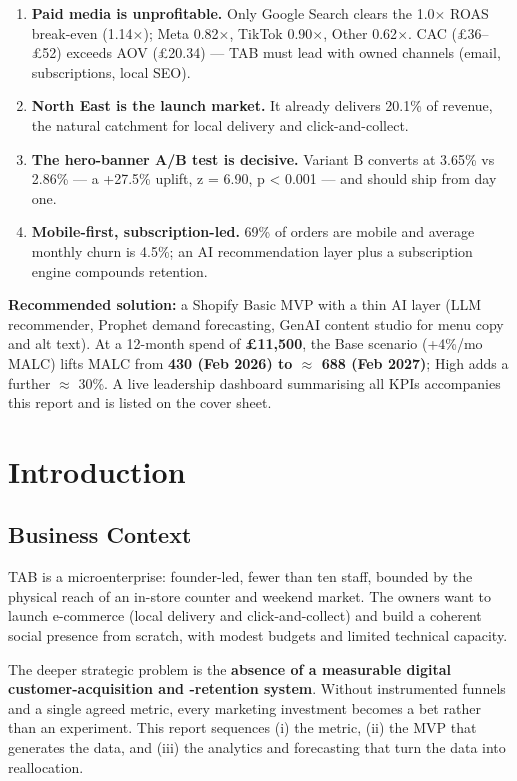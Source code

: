 \documentclass[
  11pt,
]{article}
\providecommand{\tightlist}{%
  \setlength{\itemsep}{0pt}\setlength{\parskip}{0pt}}
\begin{document}
\begin{enumerate}
\def\labelenumi{\arabic{enumi}.}
\tightlist
\item
  \textbf{Paid media is unprofitable.} Only Google Search clears the
  1.0\(\times\) ROAS break-even (1.14\(\times\)); Meta 0.82\(\times\),
  TikTok 0.90\(\times\), Other 0.62\(\times\). CAC (£36--£52) exceeds
  AOV (£20.34) --- TAB must lead with owned channels (email,
  subscriptions, local SEO).
\item
  \textbf{North East is the launch market.} It already delivers 20.1\%
  of revenue, the natural catchment for local delivery and
  click-and-collect.
\item
  \textbf{The hero-banner A/B test is decisive.} Variant B converts at
  3.65\% vs 2.86\% --- a +27.5\% uplift, z = 6.90, p \textless{} 0.001
  --- and should ship from day one.
\item
  \textbf{Mobile-first, subscription-led.} 69\% of orders are mobile and
  average monthly churn is 4.5\%; an AI recommendation layer plus a
  subscription engine compounds retention.
\end{enumerate}

\textbf{Recommended solution:} a Shopify Basic MVP with a thin AI layer
(LLM recommender, Prophet demand forecasting, GenAI content studio for
menu copy and alt text). At a 12-month spend of \textbf{£11,500}, the
Base scenario (+4\%/mo MALC) lifts MALC from \textbf{430 (Feb 2026) to
\(\approx\) 688 (Feb 2027)}; High adds a further \(\approx\) 30\%. A
live leadership dashboard summarising all KPIs accompanies this report
and is listed on the cover sheet.

\newpage

\section{Introduction}\label{introduction}

\subsection{Business Context}\label{business-context}

TAB is a microenterprise: founder-led, fewer than ten staff, bounded by
the physical reach of an in-store counter and weekend market. The owners
want to launch e-commerce (local delivery and click-and-collect) and
build a coherent social presence from scratch, with modest budgets and
limited technical capacity.

The deeper strategic problem is the \textbf{absence of a measurable
digital customer-acquisition and -retention system}. Without
instrumented funnels and a single agreed metric, every marketing
investment becomes a bet rather than an experiment. This report
sequences (i) the metric, (ii) the MVP that generates the data, and
(iii) the analytics and forecasting that turn the data into
reallocation.
\end{document}
